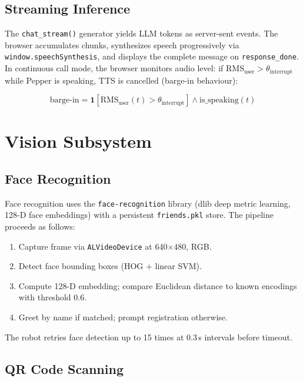 \documentclass[a4paper]{article}
\begin{document}
\subsection{Streaming Inference}

The \texttt{chat\_stream()} generator yields LLM tokens as server-sent events. The browser accumulates chunks, synthesizes speech progressively via \texttt{window.speechSynthesis}, and displays the complete message on \texttt{response\_done}. In continuous call mode, the browser monitors audio level: if $\text{RMS}_{\text{user}} > \theta_{\text{interrupt}}$ while Pepper is speaking, TTS is cancelled (barge-in behaviour):

\begin{equation}
  \text{barge-in} = \mathbf{1}\!\left[\text{RMS}_{\text{user}}(t) > \theta_{\text{interrupt}}\right] \wedge \text{is\_speaking}(t)
  \label{eq:bargein}
\end{equation}

\section{Vision Subsystem}

\subsection{Face Recognition}

Face recognition uses the \texttt{face-recognition} library (dlib deep metric learning, 128-D face embeddings) with a persistent \texttt{friends.pkl} store. The pipeline proceeds as follows:

\begin{enumerate}
  \item Capture frame via \texttt{ALVideoDevice} at 640$\times$480, RGB.
  \item Detect face bounding boxes (HOG + linear SVM).
  \item Compute 128-D embedding; compare Euclidean distance to known encodings with threshold 0.6.
  \item Greet by name if matched; prompt registration otherwise.
\end{enumerate}

The robot retries face detection up to 15 times at 0.3\,s intervals before timeout.

\subsection{QR Code Scanning}
\end{document}
